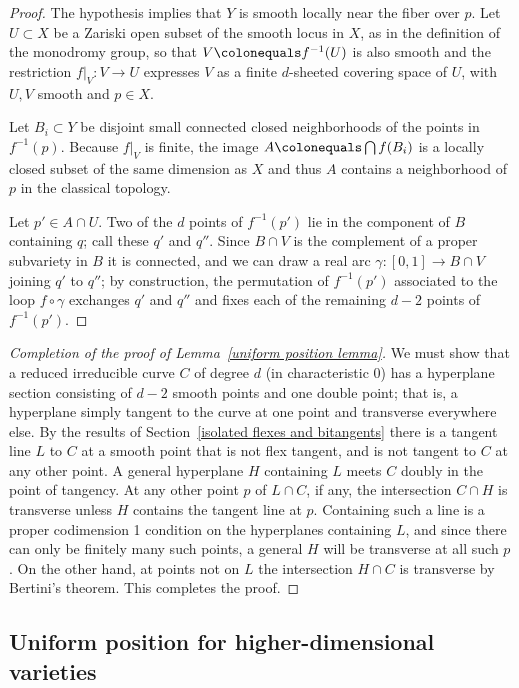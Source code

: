 \begin{proof} 
The hypothesis implies that $Y$ is smooth
locally near the fiber over $p$. Let $U \subset X$ be a Zariski open
subset of the smooth locus in $X$, as in the definition of the monodromy
group, so that  $V \colonequals  f^{-1}(U)$ is also smooth and the
restriction $f|_V : V \to U$ expresses $V$ as a finite $d$-sheeted
covering space of $U$, with $U,V$ smooth and $p\in X$.

Let $B_i\subset Y$ be disjoint small connected closed neighborhoods of
the points
in $f^{-1}(p)$. Because $f|_V$  is finite, the image $A \colonequals
\bigcap f(B_i)$  is a locally
closed subset of the same dimension as $X$ and thus $A$
 contains a neighborhood
of $p$ in the classical topology.

Let $p' \in A \cap U$. Two of the $d$ points of $f^{-1}(p')$  lie in the
component  of $B$ containing $q$; call these $q'$ and $q''$. Since $B
\cap V$ is the complement of a proper subvariety in $B$ it is connected,
and we can draw a real arc $\gamma : [0,1] \to B \cap V$ joining $q'$
to $q''$; by construction, the permutation of $f^{-1}(p')$ associated
to the loop $f \circ \gamma$  exchanges $q'$ and $q''$ and 
fixes
each
of the remaining $d-2$ points of $f^{-1}(p')$.
\end{proof}

\begin{proof}[Completion of the proof of 
Lemma~\ref{uniform position lemma}]
We  must show
that 
a reduced irreducible curve $C$ of degree $d$
 (in characteristic 0)
 has a hyperplane section consisting of $d-2$ smooth points and one
 double point; that is, a hyperplane simply tangent to the curve at one
 point and transverse everywhere else. By the results of
 Section~\ref{isolated flexes and bitangents} there is a tangent line $L$
 to $C$ at a smooth point that is not flex tangent, and is not tangent
 to $C$ at any other point. A general hyperplane $H$ containing $L$
 meets $C$ doubly in the point of
 tangency. At any other point $p$ of $L\cap C$, if any, the intersection
 $C\cap H$ is transverse
 unless $H$ contains the tangent line at $p$. Containing such a line is
 a  proper codimension 1 condition on
 the hyperplanes containing $L$, and since there can only be finitely
 many such points, a
 general  $H$ will be transverse at all such $p$. On the other hand,
 at points not on $L$
 the intersection $H\cap C$ is transverse by Bertini's theorem. This
 completes the proof.
\end{proof}

\subsection*{Uniform position for higher-dimensional varieties}

